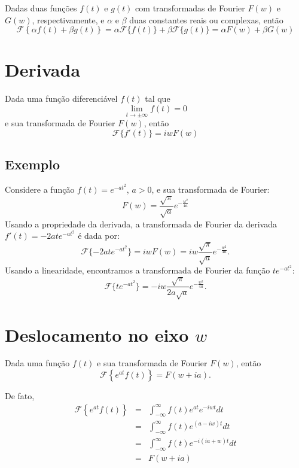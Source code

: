\documentclass[a4paper,10pt]{book}
\begin{document}
Dadas duas funções $f(t)$ e $g(t)$ com transformadas de Fourier $F(w)$ e $G(w)$, respectivamente, e $\alpha$ e $\beta$ duas constantes reais ou complexas, então
\begin{equation}
\mathcal{F}\left\{\alpha f(t)+\beta g(t)\right\}=\alpha \mathcal{F}\{ f(t)\}+\beta\mathcal{F}\{ g(t)\}=\alpha F(w)+\beta G(w)
\end{equation}
  
  \section{Derivada}
   Dada uma função diferenciável $f(t)$ tal que 
\begin{equation}\lim_{t\to \pm \infty}f(t)=0
\end{equation}
e sua transformada de Fourier $F(w)$, então
\begin{equation}
\mathcal{F}\{f'(t)\}=iw F(w)
\end{equation}

\subsection{Exemplo}
 Considere a função $f(t)=e^{-at^2}$, $a>0$, e sua transformada de Fourier:
\begin{equation}
F(w)=\frac{\sqrt{\pi}}{\sqrt{a}}e^{-\frac{w^2}{4a}}
\end{equation}
Usando a propriedade da derivada, a transformada de Fourier da derivada $f'(t)=-2 a t e^{-at^2}$ é dada por:
\begin{equation}
\mathcal{F}\{-2 a t e^{-at^2} \}=iwF(w)=iw\frac{\sqrt{\pi}}{\sqrt{a}}e^{-\frac{w^2}{4a}}.
\end{equation}
Usando a linearidade, encontramos a transformada de Fourier da função $t e^{-at^2}$:
\begin{equation}
\mathcal{F}\{  t e^{-at^2} \}=-iw\frac{\sqrt{\pi}}{2a\sqrt{a}}e^{-\frac{w^2}{4a}}.
\end{equation}

% 
% 
\section{Deslocamento no eixo $w$} Dada uma função $f(t)$ e sua transformada de Fourier $F(w)$, então
 \begin{equation}
 \mathcal{F}\left\{e^{at}f(t)\right\}=F(w+ia).
 \end{equation}

 De fato,
 \begin{eqnarray*}
 \mathcal{F}\left\{e^{at}f(t)\right\}&=&\int_{-\infty}^\infty  f(t)e^{at}e^{-iwt}dt \\
 &=&\int_{-\infty}^\infty   f(t)e^{(a-iw)t}dt \\
 &=&\int_{-\infty}^\infty   f(t)e^{-i(ia+w)t}dt \\
 &=&F(w+ia) 
 \end{eqnarray*}
\end{document}
